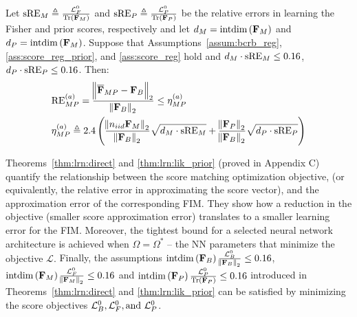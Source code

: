 \begin{theorem}\label{thm:lrn:lik_prior}
    Let $\mathrm{sRE}_M\triangleq\frac{{\mathcal{L}_{F}^{0}}}{\mathrm{Tr}\left(\mathbf{F}_{M}\right)}$ and $\mathrm{sRE}_P\triangleq\frac{{\mathcal{L}_{P}^{0}}}{\mathrm{Tr}\left(\mathbf{F}_{P}\right)}$ be the {relative errors in learning the Fisher and prior scores}, respectively and let ${{d}_M}=\mathrm{intdim}\left(\mathbf{F}_{M}\right)$ and ${{d}_P}=\mathrm{intdim}\left(\mathbf{F}_{M}\right)$. %
    Suppose that Assumptions~\ref{assum:bcrb_reg}, \ref{ass:score_reg_prior}, and \ref{ass:score_reg} hold and ${{{d}_M}\cdot \mathrm{sRE}_M}\leq {0.16}$, ${{{d}_P}\cdot \mathrm{sRE}_P}\leq {0.16}$. 
    Then:
    \begin{align}\label{eq:error_learn_lik_prior_approch}
        &%
        {\mathrm{RE}_{MP}^{(a)}}=\frac{\norm{\lbfimlp-\fb}_2}{\norm{\fb}_2} \leq  \mpfle\\
    &\mpfle\triangleq2.4\brackets{\frac{\norm{%
    {\niideval}\fm}_2}{\norm{\fb}_2}\sqrt{\dm\cdot\mathrm{sRE}_M}+\frac{\norm{\fp}_2}{\norm{\fb}_2}\sqrt{ \intdp\cdot\mathrm{sRE}_P}}\nonumber
    \end{align}
\end{theorem}

Theorems~\ref{thm:lrn:direct} and \ref{thm:lrn:lik_prior} %
{(proved in Appendix C)} %
{quantify the} relationship between the %
{score matching} optimization objective, %
{(or equivalently, the relative error in %
{approximating} the score vector),} and the  %
{approximation error} %
{of the corresponding FIM}. They %
{show how a} reduction in the objective (smaller score %
{approximation error}) %
{translates to} a smaller learning error %
{for the FIM}.  %
Moreover, the tightest bound for a selected neural network architecture is achieved when %
{$\Omega
=\Omega^*$ --  the NN parameters that minimize the objective $\mathcal{L}$.} 
Finally, the assumptions $\mathrm{intdim}\left(\mathbf{F}_{B}\right)\frac{{\mathcal{L}_{B}^{0}}}{\norm{\mathbf{F}_{B}}_2}\leq 0.16$, $\mathrm{intdim}\left(\mathbf{F}_{M}\right)\frac{{\mathcal{L}_{F}^{0}}}{\norm{\mathbf{F}_{M}}_2}\leq 0.16$ and $\mathrm{intdim}\left(\mathbf{F}_{P}\right)\frac{{\mathcal{L}_{P}^{0}}}{\mathrm{Tr}\left(\mathbf{F}_{P}\right)}\leq 0.16$ 
introduced in Theorems~\ref{thm:lrn:direct} and \ref{thm:lrn:lik_prior} can be satisfied  by minimizing the score %
{objectives} ${\mathcal{L}_{B}^{0}}, {\mathcal{L}_{F}^{0}}, \text{and } {\mathcal{L}_{P}^{0}}$.


